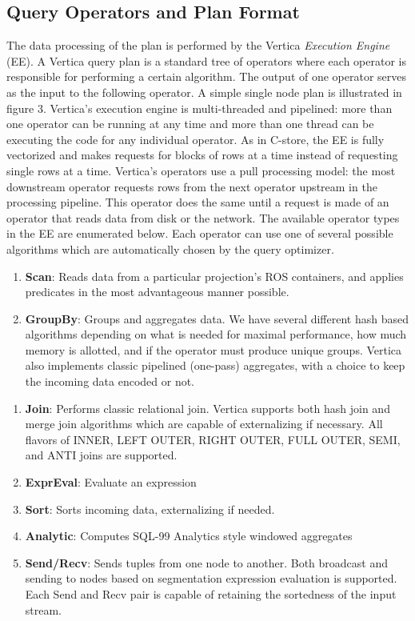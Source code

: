 \documentclass[a4paper,12pt,notitlepage,twoside,openright]{article}
\begin{document}
\hypertarget{query-operators-and-plan-format}{%
\subsection{Query Operators and Plan
Format}\label{query-operators-and-plan-format}}

The data processing of the plan is performed by the Vertica
\emph{Execution Engine} (EE). A Vertica query plan is a standard tree of
operators where each operator is responsible for performing a certain
algorithm. The output of one operator serves as the input to the
following operator. A simple single node plan is illustrated in figure
3. Vertica's execution engine is multi-threaded and pipelined: more than
one operator can be running at any time and more than one thread can be
executing the code for any individual operator. As in C-store, the EE is
fully vectorized and makes requests for blocks of rows at a time instead
of requesting single rows at a time. Vertica's operators use a pull
processing model: the most downstream operator requests rows from the
next operator upstream in the processing pipeline. This operator does
the same until a request is made of an operator that reads data from
disk or the network. The available operator types in the EE are
enumerated below. Each operator can use one of several possible
algorithms which are automatically chosen by the query optimizer.

\begin{enumerate}
\def\labelenumi{\arabic{enumi}.}
\item
  \textbf{Scan}: Reads data from a particular projection's ROS
  containers, and applies predicates in the most advantageous manner
  possible.
\item
  \textbf{GroupBy}: Groups and aggregates data. We have several
  different hash based algorithms depending on what is needed for
  maximal performance, how much memory is allotted, and if the operator
  must produce unique groups. Vertica also implements classic pipelined
  (one-pass) aggregates, with a choice to keep the incoming data encoded
  or not.
\end{enumerate}

\begin{enumerate}
\def\labelenumi{\arabic{enumi}.}
\setcounter{enumi}{2}
\item
  \textbf{Join}: Performs classic relational join. Vertica supports both
  hash join and merge join algorithms which are capable of externalizing
  if necessary. All flavors of INNER, LEFT OUTER, RIGHT OUTER, FULL
  OUTER, SEMI, and ANTI joins are supported.
\item
  \textbf{ExprEval}: Evaluate an expression
\item
  \textbf{Sort}: Sorts incoming data, externalizing if needed.
\item
  \textbf{Analytic}: Computes SQL-99 Analytics style windowed aggregates
\item
  \textbf{Send/Recv}: Sends tuples from one node to another. Both
  broadcast and sending to nodes based on segmentation expression
  evaluation is supported. Each Send and Recv pair is capable of
  retaining the sortedness of the input stream.
\end{enumerate}
\end{document}
